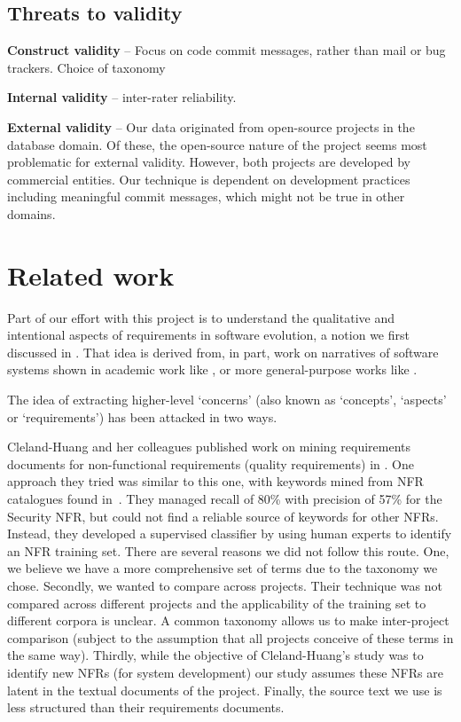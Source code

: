 \documentclass{acm_proc_article-sp}
\begin{document}

\subsection{Threats to validity}
\textbf{Construct validity} -- Focus on code commit messages, rather than mail or bug trackers. Choice of taxonomy

\textbf{Internal validity} -- inter-rater reliability.

\textbf{External validity} -- Our data originated from open-source projects in the database domain. Of these, the open-source nature of the project seems most problematic for external validity. However, both projects are developed by commercial entities. Our technique is dependent on development practices including meaningful commit messages, which might not be true in other domains.

\section{Related work}

Part of our effort with this project is to understand the qualitative and intentional aspects of requirements in software evolution, a notion we first discussed in \cite{ernst07icsm}. That idea is derived from, in part, work on narratives of software systems shown in academic work like \cite{anton01}, or more general-purpose works like \cite{waldo93}.

The idea of extracting higher-level `concerns' (also known as `concepts', `aspects' or `requirements') has been attacked in two ways.

Cleland-Huang and her colleagues published work on mining requirements documents for non-functional requirements (quality requirements) in \cite{Cleland-Huang2006}. One approach they tried was similar to this one, with keywords mined from NFR catalogues found in~\cite{chung99}. They managed recall of 80\% with precision of 57\% for the Security NFR, but could not find a reliable source of keywords for other NFRs. Instead, they developed a supervised classifier by using human experts to identify an NFR training set. There are several reasons we did not follow this route. One, we believe we have a more comprehensive set of terms due to the taxonomy we chose. Secondly, we wanted to compare across projects. Their technique was not compared across different projects and the applicability of the training set to different corpora is unclear. A common taxonomy allows us to make inter-project comparison (subject to the assumption that all projects conceive of these terms in the same way). Thirdly, while the objective of Cleland-Huang's study was to identify new NFRs (for system development) our study assumes these NFRs are latent in the textual documents of the project. Finally, the source text we use is less structured than their requirements documents.
\end{document}
